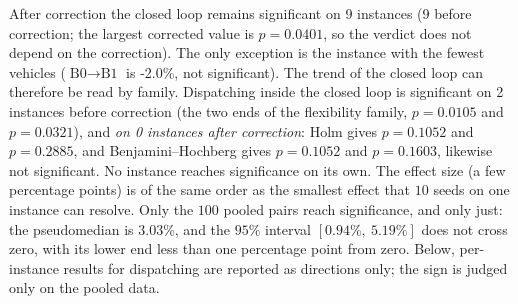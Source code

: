 \documentclass[manuscript,screen,review]{acmart}
\newcommand{\NCases}{10}
\newcommand{\NSeeds}{10}
\newcommand{\NPairs}{100}
\newcommand{\HLProbeLoop}{3.03\%}
\newcommand{\CIProbeLoop}{$[0.94\%,\ 5.19\%]$}
\newcommand{\CellsSigLoop}{9}
\newcommand{\CellsSigLoopAdj}{9}
\newcommand{\CellsSigProbe}{2}
\newcommand{\CellsSigProbeAdj}{0}
\newcommand{\GainLoopStarve}{-2.0\%}     %
\newcommand{\PProbeFlexLoRaw}{=0.0105}
\newcommand{\PProbeFlexLoHolm}{=0.1052}
\newcommand{\PProbeFlexLoBH}{=0.1052}
\newcommand{\PProbeFlexHiRaw}{=0.0321}
\newcommand{\PProbeFlexHiHolm}{=0.2885}
\newcommand{\PProbeFlexHiBH}{=0.1603}
\newcommand{\PLoopCellMax}{=0.0401}
\begin{document}
After correction the closed loop remains significant on \CellsSigLoopAdj{} instances (\CellsSigLoop{} before correction; the largest corrected value is $p\PLoopCellMax$, so the verdict does not depend on the correction). The only exception is the instance with the fewest vehicles ($\text{B0}\to\text{B1}$ is \GainLoopStarve{}, not significant). The trend of the closed loop can therefore be read by family.
Dispatching inside the closed loop is significant on \CellsSigProbe{} instances before correction (the two ends of the flexibility family, $p\PProbeFlexLoRaw$ and $p\PProbeFlexHiRaw$), and \emph{on \CellsSigProbeAdj{} instances after correction}: Holm gives $p\PProbeFlexLoHolm$ and $p\PProbeFlexHiHolm$, and Benjamini--Hochberg gives $p\PProbeFlexLoBH$ and $p\PProbeFlexHiBH$, likewise not significant.
No instance reaches significance on its own. The effect size (a few percentage points) is of the same order as the smallest effect that $\NSeeds$ seeds on one instance can resolve. Only the $\NPairs$ pooled pairs reach significance, and only just: the pseudomedian is \HLProbeLoop{}, and the $95\%$ interval \CIProbeLoop{} does not cross zero, with its lower end less than one percentage point from zero.
Below, per-instance results for dispatching are reported as directions only; the sign is judged only on the pooled data.

\begin{table}[t]
\caption{Per-instance results of the four-level ladder and the two effects, closed loop and dispatching, blocked by the three families (each instance has $n=\NSeeds$ comparisons paired by seed).
Significance marks follow the \textbf{Holm-corrected} $p$ (two-sided Wilcoxon signed-rank test), the family being the
$\NCases$ instances of one effect: $^{*}p<0.05$, $^{**}p<0.01$; $^{\dagger}$ means significant before correction but not after, and the sign of that instance is not taken as a conclusion.
A negative value means a lower makespan. The two gain columns use the same estimator as Table~\ref{tab:main} (the mean of pairwise relative gains over seeds) and cannot be obtained by dividing the two means in the same row.
\texttt{A funnel} is at once $N_A/N_M=1.5$ of Family~B and $F=0.6$ of Family~C; it is run only once and occupies only one row.}
\label{tab:bytag}
\small

\end{table}
\end{document}
